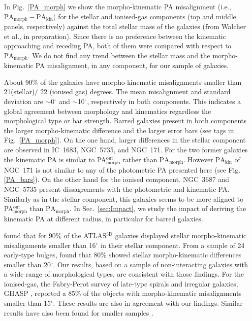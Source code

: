 \documentclass[longauth,traditabstract]{aa}
\begin{document}
In Fig.~\ref{PA_morph} we show the morpho-kinematic PA misalignment (i.e.,
$\mathrm{PA_{morph}}-\mathrm{PA_{kin}}$) for the stellar and ionised-gas
components (top and middle panels, respectively) against the total stellar mass
of the galaxies (from Walcher et al., in preparation). Since there is no
preference between the kinematic approaching and receding PA, both of them were
compared with respect to $\mathrm{PA_{morph}}$. We do not find any trend between
the stellar mass and the morpho-kinematic PA misalignment, in any component, for
our sample of galaxies.

About 90\% of the galaxies have morpho-kinematic misalignments smaller than 21(stellar)/ 22 (ionised gas) degrees. The mean misalignment and standard deviation are $\sim$0$^\circ$ and $\sim$10$^\circ$, respectively  in both components.  This indicates a global agreement between morphology and kinematics regardless the morphological type or bar strength. Barred galaxies present in both components the larger morpho-kinematic difference and the larger error bars (see tags in Fig.~\ref{PA_morph}). On the one hand, larger differences in the stellar component are observed in  IC~1683, NGC~5735, and NGC~171. For the two former galaxies the kinematic PA is similar to PA$\mathrm{_{morph}^{out}}$ rather than  $\mathrm{PA_{morph}}$. However $\mathrm{PA_{kin}}$ of NGC~171 is not similar to any of the photometric PA presented here (see Fig. \ref{PA_bars}). On the other hand for the ionised component, NGC~3687 and NGC~5735 present dissagrements with the photometric and kinematic PA. Similarly as in the stellar component, this galaxies seems to be more aligned to PA$\mathrm{_{morph}^{out}}$ than $\mathrm{PA_{morph}}$.
In Sec.~\ref{sec:Impact}, we study the impact of deriving the kinematic PA at different radius, in particular for barred galaxies. 

\cite{2011MNRAS.414.2923K} found that for 90\% of the ATLAS$^{\mathrm{3D}}$
galaxies displayed stellar morpho-kinematic misalignments smaller than
16$^\circ$ in their stellar component. From a sample of 24 early-type bulges,
\cite{2006MNRAS.369..529F} found that 80\% showed stellar morpho-kinematic
differences smaller than 20$^\circ$. Our results, based on a sample of
non-interacting galaxies with a wide range of morphological types, are
consistent with those findings. For the ionised-gas, the Fabry-Perot survey of
late-type spirals and irregular galaxies, GHASP \citep[][]{2008MNRAS.388..500E},
reported a 85\% of the objects with morpho-kinematic misalignments smaller than
15$^\circ$. These results are also in agreement with our findings. Similar
results have also been found for smaller samples \citep[e.g.][]{2008A&A...488..117K}.
\end{document}

